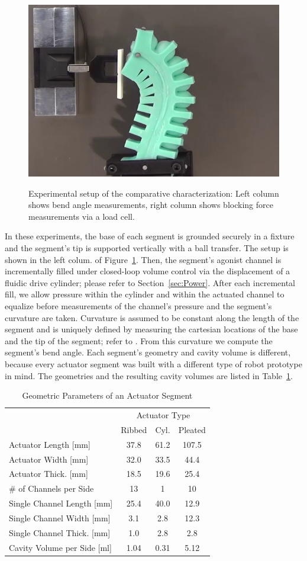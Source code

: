 \begin{figure}
{\includegraphics[width=0.47\columnwidth, trim = 15mm 6mm 55mm 25mm, clip]
{figures/actuators/expsetup/force/force_pleat_final.png}
\label{force_pleat_fin}}
\caption[Experimental setup of the comparative characterization]{Experimental setup of the comparative characterization: Left column shows bend angle measurements, right column shows blocking force measurements via a load cell.}\label{fig:characterization_setup}
\end{figure}
%
In these experiments, the base of each segment is grounded securely in a fixture and the segment's tip is supported vertically with a ball transfer. %
%
The setup is shown in the left colum. of Figure~\ref{fig:characterization_setup}.
%
Then, the segment's agonist channel is incrementally filled under closed-loop volume control via the displacement of a fluidic drive cylinder; please refer to Section~\ref{sec:Power}.
%
After each incremental fill, we allow pressure within the cylinder and within the actuated channel to equalize before measurements of the channel's pressure and the segment's curvature are taken.
%
Curvature is assumed to be constant along the length of the segment and is uniquely defined by measuring the cartesian locations of the base and the tip of the segment; refer to \citet{marchese2014design}.
%
From this curvature we compute the segment's bend angle.
%
Each segment's geometry and cavity volume is different, because every actuator segment was built with a different type of robot prototype in mind. The geometries and the resulting cavity volumes are listed in Table~\ref{tab:ComparativeCharacterization}.
\begin{table}[htb]
\caption{Geometric Parameters of an Actuator Segment}
\centering
\begin{tabular}{l c c c}
& \multicolumn{3}{c}{Actuator Type}\\
\cline{2-4}
 & Ribbed & Cyl. & Pleated\\
\hline
Actuator Length [mm] & 37.8  & 61.2  & 107.5\\
Actuator Width [mm] & 32.0  & 33.5 & 44.4\\
Actuator Thick. [mm] & 18.5 & 19.6 & 25.4\\
\# of Channels per Side & 13 & 1 & 10\\
Single Channel Length [mm] & 25.4 & 40.0 & 12.9\\
Single Channel Width [mm] & 3.1  & 2.8 & 12.3\\
Single Channel Thick. [mm] & 1.0 & 2.8 & 2.8\\
Cavity Volume per Side [ml] & 1.04 & 0.31 & 5.12 \\
\hline
\end{tabular}
\label{tab:ComparativeCharacterization}
\end{table}
